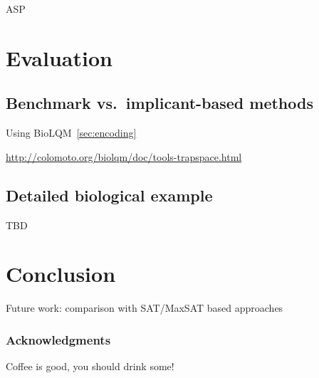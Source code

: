 \documentclass[runningheads]{llncs}
\begin{document}
ASP

\section{Evaluation}
\subsection{Benchmark vs.\ implicant-based methods}

Using BioLQM~\ref{sec:encoding}

\url{http://colomoto.org/biolqm/doc/tools-trapspace.html}

\subsection{Detailed biological example}

TBD

\section{Conclusion}

Future work: comparison with SAT/MaxSAT based approaches~\cite{nabli2016enumerating}

\subsubsection{Acknowledgments}
Coffee is good, you should drink some!



\end{document}
